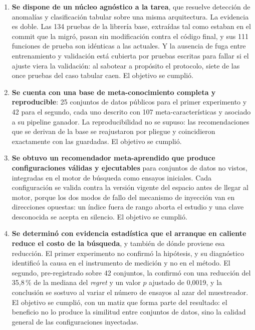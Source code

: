 \documentclass[12pt,letterpaper,oneside]{article}
\begin{document}
\begin{enumerate}
  \item \textbf{Se dispone de un núcleo agnóstico a la tarea}, que resuelve detección de
        anomalías y clasificación tabular sobre una misma arquitectura. La evidencia es
        doble. Las 134 pruebas de la librería base, extraídas tal como estaban en el commit
        que la migró, pasan sin modificación contra el código final, y sus 111 funciones de
        prueba son idénticas a las actuales. Y la ausencia de fuga entre entrenamiento y
        validación está cubierta por pruebas escritas para fallar si el ajuste viera la
        validación: al sabotear a propósito el protocolo, siete de las once pruebas del
        caso tabular caen. El objetivo se cumplió.

  \item \textbf{Se cuenta con una base de meta-conocimiento completa y reproducible}: 25
        conjuntos de datos públicos para el primer experimento y 42 para el segundo, cada uno
        descrito con 107 meta-características y asociado a su pipeline ganador. La
        reproducibilidad no se supuso: las recomendaciones que se derivan de la base se
        reajustaron por pliegue y coincidieron exactamente con las guardadas. El objetivo se
        cumplió.

  \item \textbf{Se obtuvo un recomendador meta-aprendido que produce configuraciones
        válidas y ejecutables} para conjuntos de datos no vistos, integradas en el motor
        de búsqueda como ensayos iniciales. Cada configuración se valida contra la versión
        vigente del espacio antes de llegar al motor, porque los dos modos de fallo del
        mecanismo de inyección van en direcciones opuestas: un índice fuera de rango aborta
        el estudio y una clave desconocida se acepta en silencio. El objetivo se cumplió.

  \item \textbf{Se determinó con evidencia estadística que el arranque en caliente reduce
        el costo de la búsqueda}, y también de dónde proviene esa reducción. El primer
        experimento no confirmó la hipótesis, y su diagnóstico identificó la causa en el
        instrumento de medición y no en el método. El segundo, pre-registrado sobre 42
        conjuntos, la confirmó con una reducción del 35,8\,\% de la mediana del
        \textit{regret} y un valor $p$ ajustado de 0,0019, y la conclusión se sostuvo al
        variar el número de ensayos al azar del muestreador. El objetivo se cumplió, con un
        matiz que forma parte del resultado: el beneficio no lo produce la similitud entre
        conjuntos de datos, sino la calidad general de las configuraciones inyectadas.
\end{enumerate}
\end{document}

